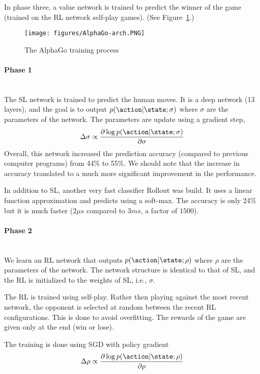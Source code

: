In phase three, a value network is trained to predict the winner of
the game (trained on the RL network self-play games). (See
Figure~\ref{fig:AlphaGo-arch}.)


\begin{figure}
  \begin{centering}
  \texttt{[image: figures/AlphaGo-arch.PNG]}\\
  \caption{The AlphaGo training process}\label{fig:AlphaGo-arch}
  \end{centering}
\end{figure}

\paragraph{Phase 1}\ \\
The SL network is trained to predict the human moves. It is a deep
network (13 layers), and the goal is to output
$p(\action|\state;\sigma)$ where $\sigma$ are the parameters of the
network. The parameters are update using a gradient step,
\[
\Delta \sigma \propto \frac{\partial \log
p(\action|\state;\sigma)}{\partial \sigma}
\]
Overall, this network increased the prediction accuracy (compared to
previous computer programs) from 44\% to 55\%. We should note that
the increase in accuracy translated to a much more significant
improvement in the performance.

In addition to SL, another very fast classifier Rollout was build.
It uses a linear function approximation and predicts using a
soft-max. The accuracy is only 24\% but it is much faster ($2\mu s$
compared to $3ms$,  a factor of $1500$).

\paragraph{Phase 2}\ \\
We learn an RL network that outputs $p(\action|\state;\rho)$ where
$\rho$ are the parameters of the network. The network structure is
identical to that of SL, and the RL is initialized to the weights of
SL, i.e., $\sigma$.

The RL is trained using self-play. Rather then playing against the
most recent network, the opponent is selected at random between the
recent RL configurations. This is done to avoid overfitting. The
rewards of the game are given only at the end (win or lose).

The training is done using SGD with policy gradient
\[
\Delta \rho \propto \frac{\partial \log
p(\action|\state;\rho)}{\partial \rho}
\]

